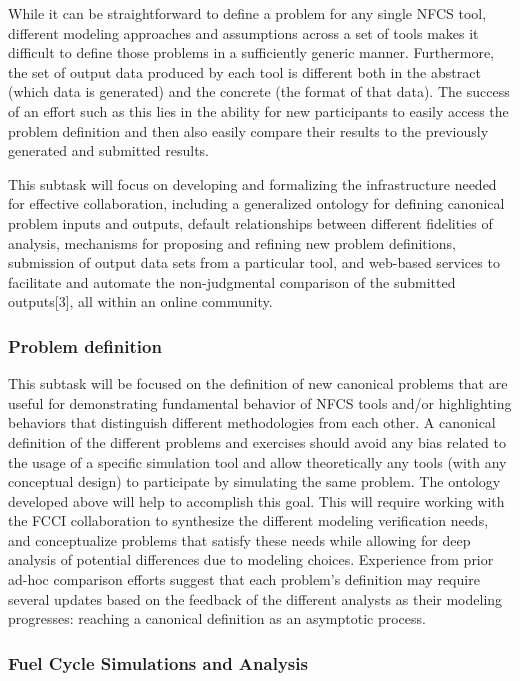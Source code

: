 While it can be straightforward to define a problem for any single \gls{NFCS} tool,
different modeling approaches and assumptions across a set of tools makes it
difficult to define those problems in a sufficiently generic manner.
Furthermore, the set of output data produced by each tool is different both in
the abstract (which data is generated) and the concrete (the format of that
data). The success of an effort such as this lies in the ability for new
participants to easily access the problem definition and then also easily
compare their results to the previously generated and submitted results.

This subtask will focus on developing and formalizing the infrastructure
needed for effective collaboration, including a generalized ontology for
defining canonical problem inputs and outputs, default relationships between
different fidelities of analysis, mechanisms for proposing and refining new
problem definitions, submission of output data sets from a particular tool,
and web-based services to facilitate and automate the non-judgmental
comparison of the submitted outputs[3], all within an online community.

\subsubsection{Problem definition} 

This subtask will be focused on the definition of new canonical problems that are
useful for demonstrating fundamental behavior of \gls{NFCS} tools and/or
highlighting behaviors that distinguish different methodologies from each
other. A canonical definition of the different problems and exercises should
avoid any bias related to the usage of a specific simulation tool and allow
theoretically any tools (with any conceptual design) to participate by
simulating the same problem. The ontology developed above will help to
accomplish this goal. This will require working with the \gls{FCCI}
collaboration to synthesize the different modeling verification needs, and
conceptualize problems that satisfy these needs while allowing for deep
analysis of potential differences due to modeling choices.  Experience from
prior ad-hoc comparison efforts suggest that each problem’s definition may
require several updates based on the feedback of the different analysts as
their modeling progresses: reaching a canonical definition as an asymptotic
process.

\subsubsection{Fuel Cycle Simulations and Analysis} 

